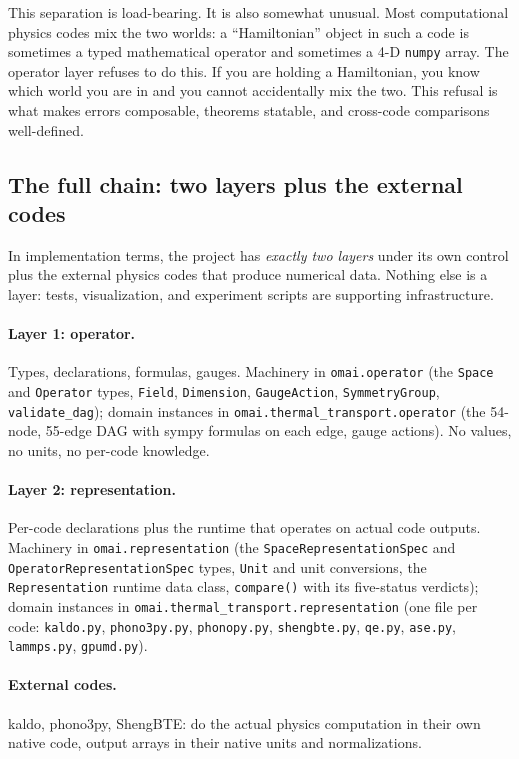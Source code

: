\documentclass[11pt,a4paper]{article}
\begin{document}
This separation is load-bearing. It is also somewhat unusual. Most computational physics codes
mix the two worlds: a ``Hamiltonian'' object in such a code is sometimes a typed mathematical
operator and sometimes a 4-D \texttt{numpy} array. The operator layer refuses to do this. If you are
holding a Hamiltonian, you know which world you are in and you cannot
accidentally mix the two. This refusal is what makes errors composable, theorems statable, and
cross-code comparisons well-defined.

\subsection{The full chain: two layers plus the external codes}
\label{ssec:two-layer-chain}

In implementation terms, the project has \emph{exactly two layers} under its
own control plus the external physics codes that produce numerical data.
Nothing else is a layer: tests, visualization, and experiment scripts are
supporting infrastructure.

\paragraph{Layer 1: operator.} Types, declarations, formulas, gauges.
Machinery in \texttt{omai.operator} (the \texttt{Space} and
\texttt{Operator} types, \texttt{Field}, \texttt{Dimension},
\texttt{GaugeAction}, \texttt{SymmetryGroup}, \texttt{validate\_dag});
domain instances in \texttt{omai.thermal\_transport.operator} (the
54-node, 55-edge DAG with sympy formulas on each edge, gauge actions).
No values, no units, no per-code knowledge.

\paragraph{Layer 2: representation.} Per-code declarations plus the
runtime that operates on actual code outputs. Machinery in
\texttt{omai.representation} (the \texttt{SpaceRepresentationSpec} and
\texttt{OperatorRepresentationSpec} types, \texttt{Unit} and unit conversions,
the \texttt{Representation} runtime data class, \texttt{compare()} with
its five-status verdicts); domain instances in
\texttt{omai.thermal\_transport.representation} (one file per code:
\texttt{kaldo.py}, \texttt{phono3py.py}, \texttt{phonopy.py},
\texttt{shengbte.py}, \texttt{qe.py}, \texttt{ase.py}, \texttt{lammps.py},
\texttt{gpumd.py}).

\paragraph{External codes.} kaldo, phono3py, ShengBTE: do the actual
physics computation in their own native code, output arrays in their
native units and normalizations.
\end{document}
